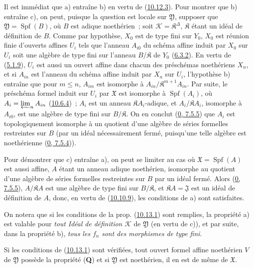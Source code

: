 Il est immédiat que a) entraîne b) en vertu de
(\hyperref[I.10.12.3-fr]{10.12.3}). Pour montrer que b) entraîne c), on
peut, puisque la question est locale sur $\mathfrak{Y}$, supposer que
$\mathfrak{Y}=\operatorname{Spf}(B)$, où $B$ est adique noethérien~; soit
$\mathscr{K}=\mathfrak{K}^\Delta$, $\mathfrak{K}$ étant un idéal de
définition de $B$. Comme par hypothèse, $X_0$ est de type fini sur $Y_0$,
$X_0$ est réunion finie d'ouverts affines $U_i$ tels que l'anneau $A_{i0}$
du schéma affine induit par $X_0$ sur $U_i$ soit une algèbre de type fini sur
l'anneau $B/\mathfrak{K}$ de $Y_0$
(\hyperref[I.6.3.2-fr]{6.3.2}). En vertu de
(\hyperref[I.5.1.9-fr]{5.1.9}), $U_i$ est aussi un ouvert affine dans chacun
des préschémas noethériens $X_n$, et si $A_{in}$ est l'anneau du schéma
affine induit par $X_n$ sur $U_i$, l'hypothèse b) entraîne que pour
$m\leq n$, $A_{im}$ est isomorphe à
$A_{in}/\mathfrak{K}^{m+1}A_{in}$. Par suite, le préschéma formel induit sur
$U_i$ par $\mathfrak{X}$ est isomorphe à $\operatorname{Spf}(A_i)$, où
$A_i=\varprojlim_n A_{in}$ (\hyperref[I.10.6.4-fr]{10.6.4})~; $A_i$ est un
anneau $\mathfrak{K}A_i$-adique, et $A_i/\mathfrak{K}A_i$, isomorphe à
$A_{i0}$, est une algèbre de type fini sur $B/\mathfrak{K}$. On en conclut
(\hyperref[0.7.5.5-fr]{0, 7.5.5}) que $A_i$ est topologiquement isomorphe à
un quotient d'une algèbre de séries formelles restreintes sur $B$ (par un
idéal nécessairement fermé, puisqu'une telle algèbre est noethérienne
(\hyperref[0.7.5.4-fr]{0, 7.5.4})).

Pour démontrer que c) entraîne a), on peut se limiter au cas où
$\mathfrak{X}=\operatorname{Spf}(A)$ est aussi affine, $A$ étant un anneau
adique noethérien, isomorphe au quotient d'une algèbre de séries formelles
restreintes sur $B$ par un idéal fermé. Alors
(\hyperref[0.7.5.5-fr]{0, 7.5.5}), $A/\mathfrak{K}A$ est une algèbre de type
fini sur $B/\mathfrak{K}$, et $\mathfrak{K}A=\mathfrak{J}$ est un idéal de
définition de $A$, donc, en vertu de
(\hyperref[I.10.10.9-fr]{10.10.9}), les conditions de a) sont satisfaites.

On notera que si les conditions de la prop.
(\hyperref[I.10.13.1-fr]{10.13.1}) sont remplies, la propriété a) est
valable pour \emph{tout Idéal de définition $\mathscr{K}$} de
$\mathfrak{Y}$ (en vertu de c)), et par suite, dans la propriété b),
\emph{tous les $f_n$ sont des morphismes de type fini}.

\begin{corollary}[10.13.2]
\label{I.10.13.2-fr}
Si les conditions de (\hyperref[I.10.13.1-fr]{10.13.1}) sont vérifiées,
tout ouvert formel affine noethérien $V$ de $\mathfrak{Y}$ possède la
propriété (\textbf{Q}) et si $\mathfrak{Y}$ est noethérien, il en est de
même de $\mathfrak{X}$.
\end{corollary}

